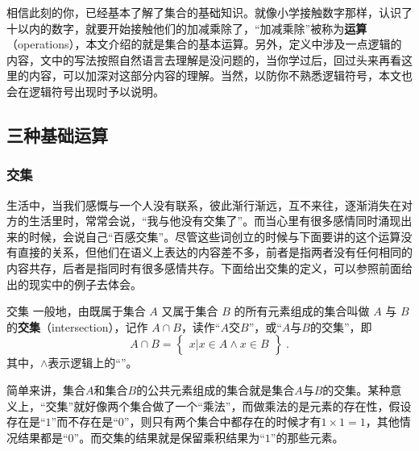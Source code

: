 

\begin{issues}
\issueDraft
\end{issues}
相信此刻的你，已经基本了解了集合的基础知识。就像小学接触数字那样，认识了十以内的数字，就要开始接触他们的加减乘除了，“加减乘除”被称为\textbf{运算}（operations），本文介绍的就是集合的基本运算。另外，定义中涉及一点逻辑的内容，文中的写法按照自然语言去理解是没问题的，当你学过后，回过头来再看这里的内容，可以加深对这部分内容的理解。当然，以防你不熟悉逻辑符号，本文也会在逻辑符号出现时予以说明。

\subsection{三种基础运算}

\subsubsection{交集}

生活中，当我们感慨与一个人没有联系，彼此渐行渐远，互不来往，逐渐消失在对方的生活里时，常常会说，“我与他没有交集了”。而当心里有很多感情同时涌现出来的时候，会说自己“百感交集”。尽管这些词创立的时候与下面要讲的这个运算没有直接的关系，但他们在语义上表达的内容差不多，前者是指两者没有任何相同的内容共存，后者是指同时有很多感情共存。下面给出交集的定义，可以参照前面给出的现实中的例子去体会。

\begin{definition}{交集}
一般地，由既属于集合 $A$ 又属于集合 $B$ 的所有元素组成的集合叫做 $A$ 与 $B$ 的\textbf{交集}（intersection），记作 $A \cap B$，读作“$A$交$B$”，或“$A$与$B$的交集”，即
\begin{equation}
A\cap B = \begin{Bmatrix} x|x\in A\land x\in B \end{Bmatrix}~.
\end{equation}
其中，$\land$表示逻辑上的“”。
\end{definition}
简单来讲，集合$A$和集合$B$的公共元素组成的集合就是集合$A$与$B$的交集。某种意义上，“交集”就好像两个集合做了一个“乘法”，而做乘法的是元素的存在性，假设存在是“$1$”而不存在是“$0$”，则只有两个集合中都存在的时候才有$1\times 1=1$，其他情况结果都是“$0$”。而交集的结果就是保留乘积结果为“$1$”的那些元素。

